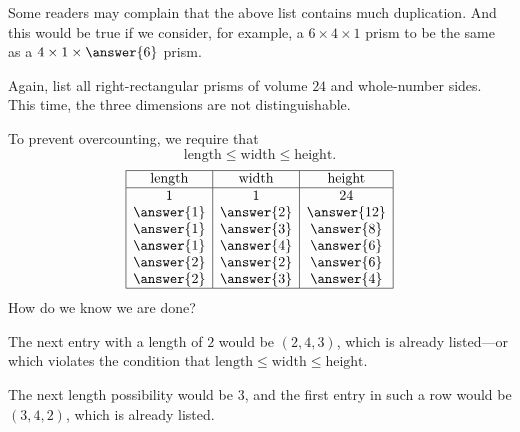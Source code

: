 \documentclass[nooutcomes]{ximera}
\begin{document}
\newpage
\begin{problem}
Some readers may complain that the above list contains much duplication.  And this would be true if we consider, for example, a $6\times4\times1$ prism to be the same as a $4\times1\times\answer{6}$ prism.  

Again, list all right-rectangular prisms of volume $24$ and whole-number sides.  This time, the three dimensions are not distinguishable. 

\begin{solution}
To prevent overcounting, we require that 
\[
\text{length} \le \text{width} \le \text{height}. 
\]
\[
\begin{array}{|c|c|c|}
\hline
\text{length} & \text{width} & \text{height} \\ 
\hline
1 & 1 & 24 \\
\answer{1} & \answer{2} & \answer{12} \\
\answer{1} & \answer{3} & \answer{8} \\
\answer{1} & \answer{4} & \answer{6} \\
\answer{2} & \answer{2} & \answer{6} \\
\answer{2} & \answer{3} & \answer{4} \\
\hline
\end{array}
\]
How do we know we are done?  
\begin{freeResponse}
\begin{hint}
The next entry with a length of $2$ would be $(2,4,3)$, which is already listed---or which violates the condition that 
$\text{length} \le \text{width} \le \text{height}$.

The next length possibility would be $3$, and the first entry in such a row would be $(3,4,2)$, which is already listed. 
\end{hint}
\end{freeResponse}
\end{solution}
\end{problem}
\end{document}
